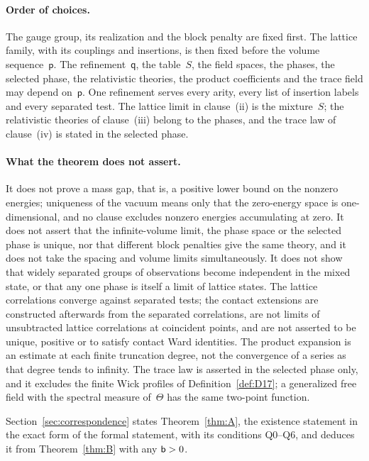 \paragraph{Order of choices.}
The gauge group, its realization and the block penalty are fixed first. The lattice family, with its couplings and insertions, is then fixed before the volume sequence~$\mathsf p$. The refinement~$\mathsf q$, the table~$S$, the field spaces, the phases, the selected phase, the relativistic theories, the product coefficients and the trace field may depend on~$\mathsf p$. One refinement serves every arity, every list of insertion labels and every separated test. The lattice limit in clause~(ii) is the mixture~$S$; the relativistic theories of clause~(iii) belong to the phases, and the trace law of clause~(iv) is stated in the selected phase.

\paragraph{What the theorem does not assert.}
It does not prove a mass gap, that is, a positive lower bound on the nonzero energies; uniqueness of the vacuum means only that the zero-energy space is one-dimensional, and no clause excludes nonzero energies accumulating at zero. It does not assert that the infinite-volume limit, the phase space or the selected phase is unique, nor that different block penalties give the same theory, and it does not take the spacing and volume limits simultaneously. It does not show that widely separated groups of observations become independent in the mixed state, or that any one phase is itself a limit of lattice states. The lattice correlations converge against separated tests; the contact extensions are constructed afterwards from the separated correlations, are not limits of unsubtracted lattice correlations at coincident points, and are not asserted to be unique, positive or to satisfy contact Ward identities. The product expansion is an estimate at each finite truncation degree, not the convergence of a series as that degree tends to infinity. The trace law is asserted in the selected phase only, and it excludes the finite Wick profiles of Definition~\ref{def:D17}; a generalized free field with the spectral measure of~$\Theta$ has the same two-point function.

Section~\ref{sec:correspondence} states Theorem~\ref{thm:A}, the existence statement in the exact form of the formal statement, with its conditions Q0--Q6, and deduces it from Theorem~\ref{thm:B} with any $\mathsf{b}>0$.

